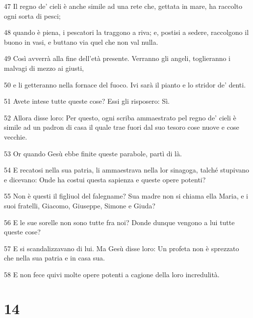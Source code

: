 \par 47 Il regno de' cieli è anche simile ad una rete che, gettata in mare, ha raccolto ogni sorta di pesci;
\par 48 quando è piena, i pescatori la traggono a riva; e, postisi a sedere, raccolgono il buono in vasi, e buttano via quel che non val nulla.
\par 49 Così avverrà alla fine dell'età presente. Verranno gli angeli, toglieranno i malvagi di mezzo ai giusti,
\par 50 e li getteranno nella fornace del fuoco. Ivi sarà il pianto e lo stridor de' denti.
\par 51 Avete intese tutte queste cose? Essi gli risposero: Sì.
\par 52 Allora disse loro: Per questo, ogni scriba ammaestrato pel regno de' cieli è simile ad un padron di casa il quale trae fuori dal suo tesoro cose nuove e cose vecchie.
\par 53 Or quando Gesù ebbe finite queste parabole, partì di là.
\par 54 E recatosi nella sua patria, li ammaestrava nella lor sinagoga, talché stupivano e dicevano: Onde ha costui questa sapienza e queste opere potenti?
\par 55 Non è questi il figliuol del falegname? Sua madre non si chiama ella Maria, e i suoi fratelli, Giacomo, Giuseppe, Simone e Giuda?
\par 56 E le sue sorelle non sono tutte fra noi? Donde dunque vengono a lui tutte queste cose?
\par 57 E si scandalizzavano di lui. Ma Gesù disse loro: Un profeta non è sprezzato che nella sua patria e in casa sua.
\par 58 E non fece quivi molte opere potenti a cagione della loro incredulità.

\chapter{14}

